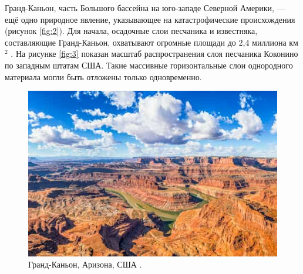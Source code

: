 \documentclass[10pt,twocolumn,letterpaper]{article}
\begin{document}
Гранд-Каньон, часть Большого бассейна на юго-западе Северной Америки, — ещё одно природное явление, указывающее на катастрофические происхождения (рисунок \ref{fig:2}). Для начала, осадочные слои песчаника и известняка, составляющие Гранд-Каньон, охватывают огромные площади до 2,4 миллиона км$^2$ \cite{21}. На рисунке \ref{fig:3} показан масштаб распространения слоя песчаника Коконино по западным штатам США. Такие массивные горизонтальные слои однородного материала могли быть отложены только одновременно.

\begin{figure}[b]
\begin{center}
   \includegraphics[width=1\linewidth]{grand-canyon.jpg}
\end{center}
   \caption{Гранд-Каньон, Аризона, США \cite{49}.}
\label{fig:2}
\label{fig:onecol}
\end{figure}
\end{document}
